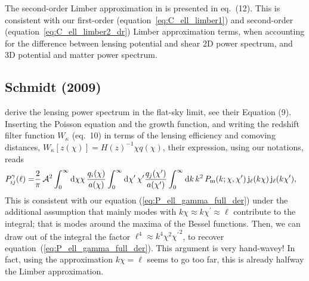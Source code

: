 \documentclass[fleqn,usenatbib]{mnras} %
\newcommand{\pref}{{\cal A}}
\begin{document}
\begin{appendix}
The second-order Limber approximation in \cite{2008PhRvD..78l3506L} is
presented in eq.~(12). This is consistent with our first-order
(equation~\ref{eq:C_ell_limber1}) and second-order
(equation~\ref{eq:C_ell_limber2_dr}) Limber approximation terms, when
accounting for the difference between lensing potential and shear 2D power
spectrum, and 3D potential and matter power spectrum.


\subsection{Schmidt (2009)}
\label{sec:schmidt08}

\cite{2008PhRvD..78d3002S} derive the lensing power spectrum in the flat-sky
limit, see their Equation (9). Inserting the Poisson equation and the
growth function, and writing the redshift filter function
$W_\kappa$ (eq.~10) in terms of the lensing efficiency and comoving distances,
$W_\kappa[z(\chi)] = H(z)^{-1} \chi q(\chi)$, their expression, using our
notations, reads
%
\begin{align}
  P_{ij}^\gamma(\ell) = & \frac 2 \pi \, \pref^2
                 \int_{0}^\infty {\rm d} \chi \chi \, \frac{q_i(\chi)}{a(\chi)}
                \int_{0}^\infty {\rm d} \chi^\prime\, \chi^\prime
                \frac{q_j(\chi^\prime)}{a(\chi^\prime)}
                \int_0^\infty {\rm d} k \, k^2 \, P_{\rm m}(k; \chi, \chi^\prime) \,
                {\rm j}_\ell(k \chi) \, {\rm j}_\ell(k \chi^\prime) ,
  \label{eq:P_ell_gamma}
\end{align}
%
This is consistent with our equation (\ref{eq:P_ell_gamma_full_der}) under the
additional assumption that mainly modes with $k \chi \approx k \chi^\prime
\approx \ell$ contribute to the integral; that is modes around the maxima of
the Bessel functions. Then, we can draw out of the integral the factor $\ell^4
\approx k^4 \chi^2 {\chi^\prime}^2$, to recover
equation~(\ref{eq:P_ell_gamma_full_der}). This argument is very hand-wavey!
In fact, using the approximation $k \chi = \ell$ seems to go too far, this is
already halfway the Limber approximation.



\end{appendix}
\end{document}
